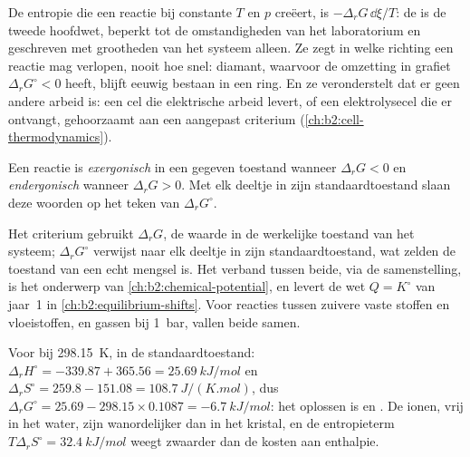 \begin{remark}\label{rem:b2:reaction-free-energy:criterion}
De entropie die een reactie bij constante $T$ en $p$ creëert, is $-\Delta_r G\,
\dd\xi/T$: de  is de tweede hoofdwet, beperkt tot de omstandigheden
van het laboratorium en geschreven met grootheden van het systeem alleen. Ze zegt
in welke richting een reactie mag verlopen, nooit hoe snel: diamant, waarvoor
de omzetting in grafiet $\Delta_r G^\circ < 0$ heeft, blijft eeuwig bestaan in een
ring. En ze veronderstelt dat er geen andere arbeid is: een cel die elektrische arbeid levert, of een
elektrolysecel die er ontvangt, gehoorzaamt aan een aangepast criterium
(\cref{ch:b2:cell-thermodynamics}).
\end{remark}

\begin{definition}\label{def:b2:reaction-free-energy:exergonic}
Een reactie is \emph{exergonisch} in een gegeven toestand wanneer
$\Delta_r G < 0$ en \emph{endergonisch} wanneer $\Delta_r G >
0$. Met elk deeltje in zijn standaardtoestand slaan deze woorden op het teken
van $\Delta_r G^\circ$.
\end{definition}

Het criterium gebruikt $\Delta_r G$, de waarde in de werkelijke toestand van het
systeem; $\Delta_r G^\circ$ verwijst naar elk deeltje in zijn standaardtoestand,
wat zelden de toestand van een echt mengsel is. Het verband tussen beide, via
de samenstelling, is het onderwerp van \cref{ch:b2:chemical-potential}, en
levert de wet $Q = K^\circ$ van jaar~1 in \cref{ch:b2:equilibrium-shifts}. Voor
reacties tussen zuivere vaste stoffen en vloeistoffen, en gassen bij \qty{1}{bar}, vallen
beide samen.

\begin{example}\label{ex:b2:reaction-free-energy:cold-pack}
Voor  bij \qty{298.15}{K}, in de
standaardtoestand: $\Delta_r H^\circ = -339.87 + 365.56 = \qty{+25.69}{kJ/mol}$ en
$\Delta_r S^\circ = 259.8 - 151.08 = \qty{+108.7}{J/(K.mol)}$, dus
$\Delta_r G^\circ = 25.69 - 298.15 \times 0.1087 = \qty{-6.7}{kJ/mol}$: het
oplossen is  en . De ionen, vrij in het water, zijn
wanordelijker dan in het kristal, en de entropieterm $T\Delta_r
S^\circ = \qty{32.4}{kJ/mol}$ weegt zwaarder dan de kosten aan enthalpie.
\end{example}

